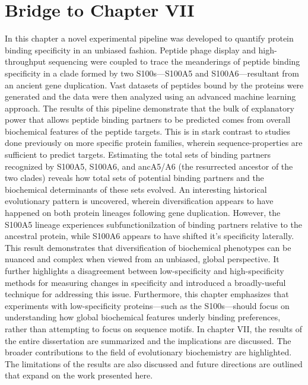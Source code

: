 \section{Bridge to Chapter VII}
In this chapter a novel experimental pipeline was developed to quantify protein binding specificity in an unbiased fashion. Peptide phage display and high-throughput sequencing were coupled to trace the meanderings of peptide binding specificity in a clade formed by two S100s---S100A5 and S100A6---resultant from an ancient gene duplication. Vast datasets of peptides bound by the proteins were generated and the data were then analyzed using an advanced machine learning approach. The results of this pipeline demonstrate that the bulk of explanatory power that allows peptide binding partners to be predicted comes from overall biochemical features of the peptide targets. This is in stark contrast to studies done previously on more specific protein families, wherein sequence-properties are sufficient to predict targets. Estimating the total sets of binding partners recognized by S100A5, S100A6, and ancA5/A6 (the resurrected ancestor of the two clades) reveals how total sets of potential binding partners and the biochemical determinants of these sets evolved. An interesting historical evolutionary pattern is uncovered, wherein diversification appears to have happened on both protein lineages following gene duplication. However, the S100A5 lineage experiences subfunctionilzation of binding partners relative to the ancestral protein, while S100A6 appears to have shifted it's specificity laterally. This result demonstrates that diversification of biochemical phenotypes can be nuanced and complex when viewed from an unbiased, global perspective. It further highlights a disagreement between low-specificity and high-specificity methods for measuring changes in specificity and introduced a broadly-useful technique for addressing this issue. Furthermore, this chapter emphasizes that experiments with low-specificity proteins---such as the S100s---should focus on understanding how global biochemical features underly binding preferences, rather than attempting to focus on sequence motifs. In chapter VII, the results of the entire dissertation are summarized and the implications are discussed. The broader contributions to the field of evolutionary biochemistry are highlighted. The limitations of the results are also discussed and future directions are outlined that expand on the work presented here. 
